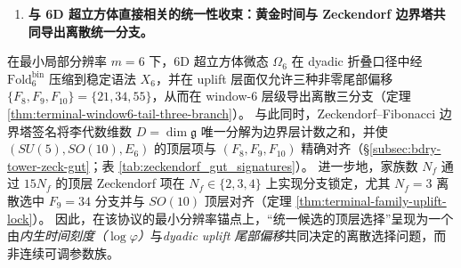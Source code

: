 \begin{enumerate}
  \begin{corollary}[环面参数化与旋转扫描的可审计原型]
  \label{cor:terminal-rotation-window-prototype}
  在一维原型中，环面旋转 \(T(x)=x+\alpha\pmod 1\) 与区间窗 \(W=[0,\beta)\) 的读出 \(s_t(x)=\ind_W(T^t x)\) 给出“旋转+\(\)窗”的标准符号接口；有限窗口 \(m\) 的局部块统计对应于模型集的有限贴片计数，从而为“扫描—窗口读出—折叠稳定语法”的统一几何语境提供可审计基准（附录 \ref{app:cut_project_background}）。
  \end{corollary}

  \item \textbf{与 6D 超立方体直接相关的统一性收束：黄金时间与 Zeckendorf 边界塔共同导出离散统一分支。}
  \end{enumerate}

\begin{theorem}
\label{thm:terminal-6d-microstate-golden-time-gut-branch}
在最小局部分辨率 \(m=6\) 下，6D 超立方体微态 \(\Omega_6\) 在 dyadic 折叠口径中经 \(\mathrm{Fold}^{\mathrm{bin}}_6\) 压缩到稳定语法 \(X_6\)，并在 uplift 层面仅允许三种非零尾部偏移 \(\{F_8,F_9,F_{10}\}=\{21,34,55\}\)，从而在 window-\(6\) 层级导出离散三分支（定理 \ref{thm:terminal-window6-tail-three-branch}）。
与此同时，Zeckendorf--Fibonacci 边界塔签名将李代数维数 \(D=\dim\mathfrak g\) 唯一分解为边界层计数之和，并使 \((SU(5),SO(10),E_6)\) 的顶层项与 \((F_8,F_9,F_{10})\) 精确对齐（\S\ref{subsec:bdry-tower-zeck-gut}；表 \ref{tab:zeckendorf_gut_signatures}）。
进一步地，家族数 \(N_f\) 通过 \(15N_f\) 的顶层 Zeckendorf 项在 \(N_f\in\{2,3,4\}\) 上实现分支锁定，尤其 \(N_f=3\) 离散选中 \(F_9=34\) 分支并与 \(SO(10)\) 顶层对齐（定理 \ref{thm:terminal-family-uplift-lock}）。
因此，在该协议的最小分辨率锚点上，“统一候选的顶层选择”呈现为一个由\emph{内生时间刻度（\(\log\varphi\)）}与\emph{dyadic uplift 尾部偏移}共同决定的离散选择问题，而非连续可调参数族。
\end{theorem}

